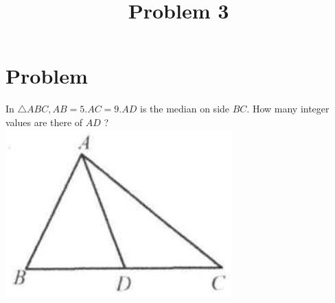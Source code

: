 \documentclass{article}
\title{Problem 3}
\date{}
\begin{document}
\maketitle

\section*{Problem}
In \(\triangle A B C, A B=5 . A C=9 . A D\) is the median on side \(B C\). How many integer values are there of \(A D\) ?\\
\centering
\includegraphics[width=\textwidth]{images/problem_image_1.jpg}
\end{document}
